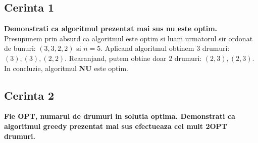 \documentclass[12pt]{article}
\begin{document}
\subsection*{Cerinta 1}
{\bfseries{Demonstrati ca algoritmul prezentat mai sus nu este optim.}} \\
Presupunem prin absurd ca algoritmul este optim si luam urmatorul sir ordonat de bunuri: $(3, 3, 2, 2)$ si $n=5$. Aplicand algoritmul obtinem 3 drumuri: $(3), (3), (2, 2)$. Rearanjand, putem obtine doar 2 drumuri: $(2, 3), (2, 3)$. \\ 
In concluzie, algoritmul \textbf{NU} este optim.

\subsection*{Cerinta 2}
{\bfseries{Fie OPT, numarul de drumuri in solutia optima. Demonstrati ca algoritmul greedy prezentat mai sus efectueaza cel mult 2OPT drumuri.}}
\end{document}
